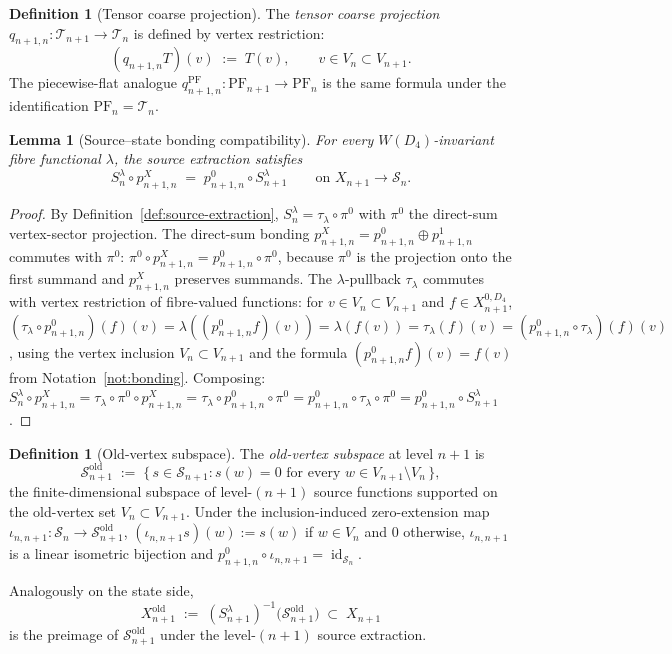 \documentclass[11pt, a4paper]{amsart}
\newtheorem{lemma}[theorem]{Lemma}
\theoremstyle{definition}
\newtheorem{definition}[theorem]{Definition}
\newcommand{\id}{\operatorname{id}}
\newcommand{\PF}{\mathrm{PF}}
\begin{document}
\begin{definition}[Tensor coarse projection]
\label{def:qn}
The \emph{tensor coarse projection} $q_{n+1, n} \colon
\mathcal T_{n+1} \to \mathcal T_n$ is defined by vertex
restriction:
\[
  (q_{n+1, n} T)(v) \;:=\; T(v), \qquad v \in V_n \subset V_{n+1}.
\]
The piecewise-flat analogue $q_{n+1, n}^\PF \colon \PF_{n+1} \to
\PF_n$ is the same formula under the identification $\PF_n =
\mathcal T_n$.
\end{definition}

\begin{lemma}[Source--state bonding compatibility]
\label{lem:source-state-bonding}
For every $W(D_4)$-invariant fibre functional $\lambda$, the
source extraction satisfies
\[
  S_n^\lambda \circ p_{n+1, n}^X
    \;=\; p_{n+1, n}^0 \circ S_{n+1}^\lambda
  \qquad \text{on } X_{n+1} \to \mathcal S_n.
\]
\end{lemma}

\begin{proof}
By Definition~\ref{def:source-extraction}, $S_n^\lambda =
\tau_\lambda \circ \pi^0$ with $\pi^0$ the direct-sum
vertex-sector projection. The direct-sum bonding $p_{n+1, n}^X =
p_{n+1, n}^0 \oplus p_{n+1, n}^1$ commutes with $\pi^0$:
$\pi^0 \circ p_{n+1, n}^X = p_{n+1, n}^0 \circ \pi^0$, because
$\pi^0$ is the projection onto the first summand and
$p_{n+1, n}^X$ preserves summands. The $\lambda$-pullback
$\tau_\lambda$ commutes with vertex restriction of
fibre-valued functions: for $v \in V_n \subset V_{n+1}$ and
$f \in X_{n+1}^{0, D_4}$,
$(\tau_\lambda \circ p_{n+1, n}^0)(f)(v) =
\lambda((p_{n+1, n}^0 f)(v)) = \lambda(f(v)) =
\tau_\lambda(f)(v) = (p_{n+1, n}^0 \circ \tau_\lambda)(f)(v)$,
using the vertex inclusion $V_n \subset V_{n+1}$ and the formula
$(p_{n+1, n}^0 f)(v) = f(v)$ from Notation~\ref{not:bonding}.
Composing:
$S_n^\lambda \circ p_{n+1, n}^X = \tau_\lambda \circ \pi^0
\circ p_{n+1, n}^X = \tau_\lambda \circ p_{n+1, n}^0 \circ \pi^0 =
p_{n+1, n}^0 \circ \tau_\lambda \circ \pi^0 = p_{n+1, n}^0 \circ
S_{n+1}^\lambda$.
\end{proof}

\begin{definition}[Old-vertex subspace]
\label{def:old-vertex-subspace}
The \emph{old-vertex subspace} at level $n+1$ is
\[
  \mathcal S_{n+1}^{\mathrm{old}}
    \;:=\; \{\,s \in \mathcal S_{n+1} :
      s(w) = 0 \text{ for every } w \in V_{n+1}\setminus V_n\,\},
\]
the finite-dimensional subspace of level-$(n+1)$ source functions
supported on the old-vertex set $V_n \subset V_{n+1}$. Under the
inclusion-induced zero-extension map
$\iota_{n, n+1} \colon \mathcal S_n \to \mathcal S_{n+1}^{\mathrm{old}}$,
$(\iota_{n, n+1} s)(w) := s(w)$ if $w \in V_n$ and $0$ otherwise,
$\iota_{n, n+1}$ is a linear isometric bijection and
$p_{n+1, n}^0 \circ \iota_{n, n+1} = \id_{\mathcal S_n}$.

Analogously on the state side,
\[
  X_{n+1}^{\mathrm{old}} \;:=\;
    (S_{n+1}^\lambda)^{-1}\bigl(\mathcal S_{n+1}^{\mathrm{old}}\bigr)
      \;\subset\; X_{n+1}
\]
is the preimage of $\mathcal S_{n+1}^{\mathrm{old}}$ under the
level-$(n+1)$ source extraction.
\end{definition}
\end{document}
